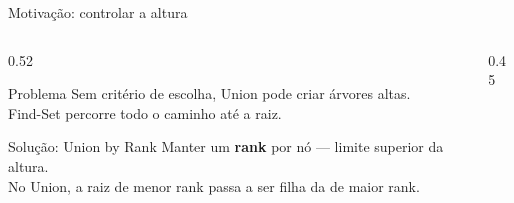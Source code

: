 \documentclass[aspectratio=169]{beamer}
\begin{document}
\begin{frame}{Motivação: controlar a altura}%
  \begin{columns}[T]
    \begin{column}{0.52\textwidth}
      \begin{block}{Problema}
        Sem critério de escolha, Union pode criar árvores altas.\\
        Find-Set percorre todo o caminho até a raiz.
      \end{block}
      \vspace{0.3cm}
      \begin{block}{Solução: Union by Rank}
        Manter um \textbf{rank} por nó — limite superior da altura.\\
        No Union, a raiz de menor rank passa a ser filha da de maior rank.
      \end{block}
    \end{column}
    \begin{column}{0.45\textwidth}
    \end{column}
  \end{columns}
\end{frame}
\end{document}
